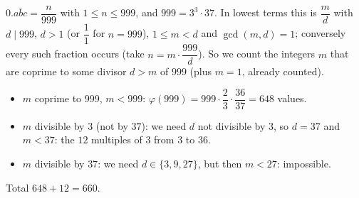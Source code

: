 $0.\overline{abc}=\dfrac{n}{999}$ with $1\le n\le999$, and $999=3^3\cdot37$. In lowest terms this is $\dfrac {m}{d}$ with $d\mid999$, $d>1$ (or $\dfrac{1}{1}$ for $n=999$), $1\le m<d$ and $\gcd(m,d)=1$; conversely every such fraction occurs (take $n=m\cdot\dfrac{999}{d}$). So we count the integers $m$ that are coprime to some divisor $d>m$ of $999$ (plus $m=1$, already counted).
\begin{itemize}
\item $m$ coprime to $999$, $m<999$: $\varphi(999)=999\cdot\dfrac{2}{3}\cdot\dfrac{36}{37}=648$ values.
\item $m$ divisible by $3$ (not by $37$): we need $d$ not divisible by $3$, so $d=37$ and $m<37$: the $12$ multiples of $3$ from $3$ to $36$.
\item $m$ divisible by $37$: we need $d\in\{3,9,27\}$, but then $m<27$: impossible.
\end{itemize}
Total $648+12=\boxed{660}$.
